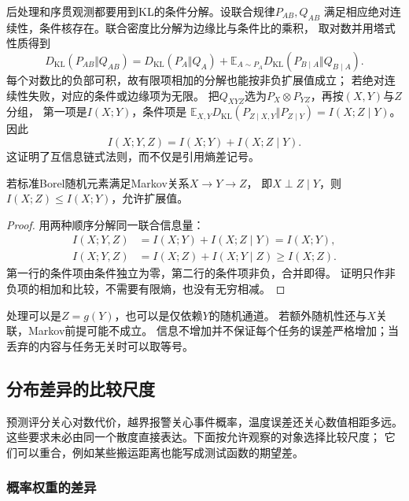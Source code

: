 后处理和序贯观测都要用到KL的条件分解。设联合规律\(P_{AB},Q_{AB}\)
满足相应绝对连续性，条件核存在。联合密度比分解为边缘比与条件比的乘积，
取对数并用塔式性质得到
\begin{equation}
  D_{\mathrm{KL}}(P_{AB}\Vert Q_{AB})
  =D_{\mathrm{KL}}(P_A\Vert Q_A)
   +\mathbb E_{A\sim P_A}
       D_{\mathrm{KL}}(P_{B\mid A}\Vert Q_{B\mid A}).
  \label{eq:information-kl-conditional-chain}
\end{equation}
每个对数比的负部可积，故有限项相加的分解也能按非负扩展值成立；
若绝对连续性失败，对应的条件或边缘项为无限。
把\(Q_{XYZ}\)选为\(P_X\otimes P_{YZ}\)，再按\((X,Y)\)与\(Z\)分组，
第一项是\(I(X;Y)\)，条件项是
\(\mathbb E_{X,Y}D_{\mathrm{KL}}(P_{Z\mid X,Y}\Vert P_{Z\mid Y})
=I(X;Z\mid Y)\)。因此
\[
  I(X;Y,Z)=I(X;Y)+I(X;Z\mid Y).
\]
这证明了互信息链式法则，而不仅是引用熵差记号。

\begin{theorem}[数据处理不等式]
\label{thm:information-data-processing}
若标准Borel随机元素满足Markov关系\(X\to Y\to Z\)，
即\(X\perp Z\mid Y\)，则\(I(X;Z)\leq I(X;Y)\)，允许扩展值。
\end{theorem}
\begin{proof}
用两种顺序分解同一联合信息量：
\[
\begin{aligned}
  I(X;Y,Z)&=I(X;Y)+I(X;Z\mid Y)=I(X;Y),\\
  I(X;Y,Z)&=I(X;Z)+I(X;Y\mid Z)\geq I(X;Z).
\end{aligned}
\]
第一行的条件项由条件独立为零，第二行的条件项非负，合并即得。
证明只作非负项的相加和比较，不需要有限熵，也没有无穷相减。
\end{proof}

处理可以是\(Z=g(Y)\)，也可以是仅依赖\(Y\)的随机通道。
若额外随机性还与\(X\)关联，Markov前提可能不成立。
信息不增加并不保证每个任务的误差严格增加；当丢弃的内容与任务无关时可以取等号。

\subsection{分布差异的比较尺度}
\label{sec:information-distribution-discrepancies}

预测评分关心对数代价，越界报警关心事件概率，温度误差还关心数值相距多远。
这些要求未必由同一个散度直接表达。下面按允许观察的对象选择比较尺度；
它们可以重合，例如某些搬运距离也能写成测试函数的期望差。

\subsubsection{概率权重的差异}
\label{sec:information-probability-discrepancy}

